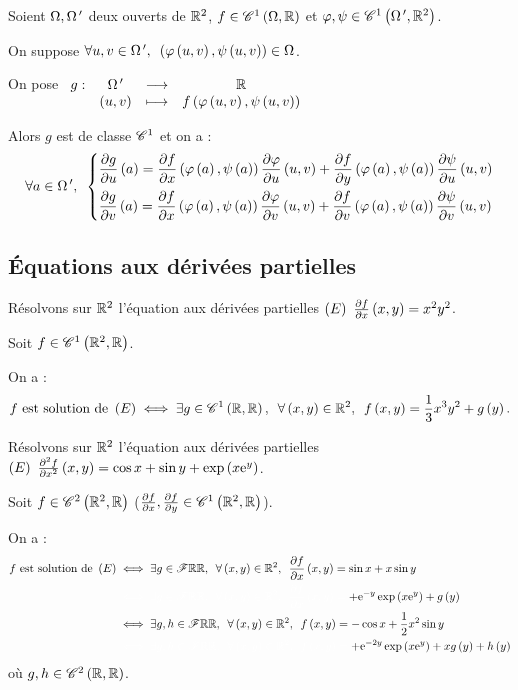 \begin{cor}
Soient \(\Omega,\Omega^{\,\prime}\) deux ouverts de \(\mathbb{R}^2\), \(f\in\mathscr{C}^{1}\left(\Omega,\mathbb{R}\right)\) et \(\varphi,\psi\in\mathscr{C}^{1}\left(\Omega^{\,\prime},\mathbb{R}^2\right)\).

On suppose \(\quantifs{\forall u,v\in\Omega\prim}\paren{\phi\paren{u,v},\psi\paren{u,v}}\in\Omega\).

On pose \(\begin{array}[t]{cccc}g : & \Omega^{\,\prime} & \longrightarrow & \mathbb{R} \\ & \left(u,v\right) & \longmapsto & f\left(\varphi\left(u,v\right),\psi\left(u,v\right)\right)\end{array}\)

Alors \(g\) est de classe \(\mathscr{C}^{1}\) et on a : \[\quantifs{\forall a\in\Omega\prim}\begin{dcases}
\pdv{g}{u}\paren{a}=\pdv{f}{x}\paren{\phi\paren{a},\psi\paren{a}}\pdv{\phi}{u}\paren{u,v}+\pdv{f}{y}\paren{\phi\paren{a},\psi\paren{a}}\pdv{\psi}{u}\paren{u,v} \\
\pdv{g}{v}\paren{a}=\pdv{f}{x}\paren{\phi\paren{a},\psi\paren{a}}\pdv{\phi}{v}\paren{u,v}+\pdv{f}{v}\paren{\phi\paren{a},\psi\paren{a}}\pdv{\psi}{v}\paren{u,v}
\end{dcases}\]
\end{cor}

\subsection{Équations aux dérivées partielles}

\begin{ex}
Résolvons sur \(\mathbb{R}^2\) l'équation aux dérivées partielles \(\left(E\right)~\pdv{f}{x}\left(x,y\right)=x^2y^2\).

Soit \(f\in\mathscr{C}^{1}\left(\mathbb{R}^2,\mathbb{R}\right)\).

On a : \[f\text{ est solution de }\paren{E}\ssi\quantifs{\exists g\in\ensclasse{1}{\R}{\R};\forall\paren{x,y}\in\R^2}f\paren{x,y}=\dfrac{1}{3}x^3y^2+g\paren{y}.\]
\end{ex}

\begin{ex}
Résolvons sur \(\mathbb{R}^2\) l'équation aux dérivées partielles \(\left(E\right)~\pdv[order=2]{f}{x}\left(x,y\right)=\cos x+\sin y+\exp\left(x\mathrm{e}^{y}\right)\).

Soit \(f\in\mathscr{C}^{2}\left(\mathbb{R}^2,\mathbb{R}\right)\) (\cad \(\pdv{f}{x},\pdv{f}{y}\in\mathscr{C}^{1}\left(\mathbb{R}^2,\mathbb{R}\right)\)).

On a : \[\begin{aligned}
f\text{ est solution de }\paren{E}&\ssi\quantifs{\exists g\in\F{\R}{\R};\forall\paren{x,y}\in\R^2}\pdv{f}{x}\paren{x,y}=\sin x+x\sin y \\
&\color{white}\ssi\quantifs{\exists g\in\F{\R}{\R};\forall\paren{x,y}\in\R^2}\pdv{f}{x}\paren{x,y}=\color{black}+\e{-y}\exp\paren{x\e{y}}+g\paren{y} \\
&\ssi\quantifs{\exists g,h\in\F{\R}{\R};\forall\paren{x,y}\in\R^2}f\paren{x,y}=-\cos x+\dfrac{1}{2}x^2\sin y \\
&\color{white}\ssi\quantifs{\exists g,h\in\F{\R}{\R};\forall\paren{x,y}\in\R^2}f\paren{x,y}=\color{black}+\e{-2y}\exp\paren{x\e{y}}+xg\paren{y}+h\paren{y}
\end{aligned}\] où \(g,h\in\mathscr{C}^{2}\left(\mathbb{R},\mathbb{R}\right)\).
\end{ex}

